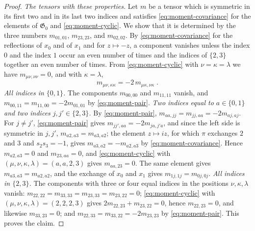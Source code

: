 \documentclass[11pt]{preprint}
\numberwithin{equation}{section}
\theoremstyle{definition}
\theoremstyle{remark}
\theoremstyle{plain}
\begin{document}
\begin{proof}
\emph{The tensors with these properties.} Let $m$ be a tensor which is symmetric in its first two and in its last two indices and satisfies \eqref{eq:moment-covariance} for the elements of $\mathfrak G_0$ and \eqref{eq:moment-cyclic}. We show that it is determined by the three numbers $m_{01,01}$, $m_{23,23}$, and $m_{02,02}$. By \eqref{eq:moment-covariance} for the reflections of $x_0$ and of $x_1$ and for $z \mapsto -z$, a component vanishes unless the index $0$ and the index $1$ occur an even number of times and the indices of $\{ 2, 3 \}$ together an even number of times. From \eqref{eq:moment-cyclic} with $\nu = \kappa = \lambda$ we have $m_{\mu\nu,\nu\nu} = 0$, and with $\kappa = \lambda$,
\begin{equation}\label{eq:moment-pair}
    m_{\mu\nu,\kappa\kappa} = -2\,m_{\mu\kappa,\nu\kappa}\;.
\end{equation}
\emph{All indices in $\{ 0, 1 \}$.} The components $m_{00,00}$ and $m_{11,11}$ vanish, and $m_{00,11} = m_{11,00} = -2m_{01,01}$ by \eqref{eq:moment-pair}. \emph{Two indices equal to $a \in \{ 0, 1 \}$ and two indices $j, j' \in \{ 2, 3 \}$.} By \eqref{eq:moment-pair}, $m_{aa,jj} = m_{jj,aa} = -2m_{aj,aj}$. For $j \neq j'$, \eqref{eq:moment-pair} gives $m_{jj',aa} = -2m_{ja,j'a}$, and since the left side is symmetric in $j, j'$, $m_{a2,a3} = m_{a3,a2}$; the element $z \mapsto iz$, for which $\pi$ exchanges $2$ and $3$ and $s_2s_3 = -1$, gives $m_{a3,a2} = -m_{a2,a3}$ by \eqref{eq:moment-covariance}. Hence $m_{a2,a3} = 0$ and $m_{23,aa} = 0$, and \eqref{eq:moment-cyclic} with $(\mu, \nu, \kappa, \lambda) = (a, a, 2, 3)$ gives $m_{aa,23} = 0$. The same element gives $m_{a3,a3} = m_{a2,a2}$, and the exchange of $x_0$ and $x_1$ gives $m_{1j,1j} = m_{0j,0j}$. \emph{All indices in $\{ 2, 3 \}$.} The components with three or four equal indices in the positions $\nu, \kappa, \lambda$ vanish: $m_{22,22} = m_{33,33} = m_{23,33} = m_{23,22} = 0$; \eqref{eq:moment-cyclic} with $(\mu, \nu, \kappa, \lambda) = (2, 2, 2, 3)$ gives $2m_{22,23} + m_{23,22} = 0$, hence $m_{22,23} = 0$, and likewise $m_{33,23} = 0$; and $m_{22,33} = m_{33,22} = -2m_{23,23}$ by \eqref{eq:moment-pair}. This proves the claim.


\end{proof}
\end{document}
